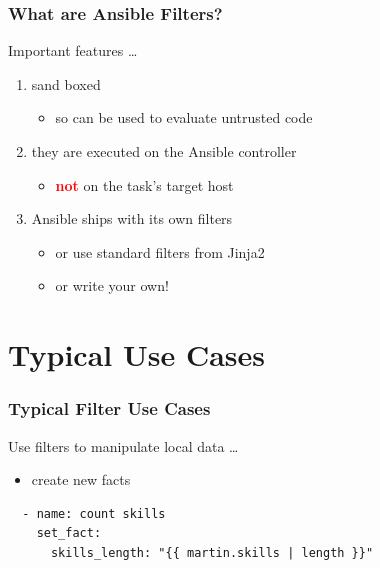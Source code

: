 \documentclass[pdf]{beamer}
\begin{document}
\begin{frame}
  \frametitle{What are Ansible Filters?}
  Important features \ldots
  \pause{}
  \begin{enumerate}
    \item{sand boxed}
      \pause{}
      \begin{itemize}
        \item{so can be used to evaluate untrusted code}
      \end{itemize}
      \pause{}
    \item{they are executed on the Ansible controller}
      \pause{}
      \begin{itemize}
        \item{\textcolor{red}{\textbf{not}} on the task's target host}
      \end{itemize}
      \pause{}
    \item{Ansible ships with its own filters}
      \pause{}
      \begin{itemize}
        \item{or use standard filters from Jinja2}
          \pause{}
        \item{or write your own!}
      \end{itemize}
  \end{enumerate}
\end{frame}

\section{Typical Use Cases}

\begin{frame}[fragile]
  \frametitle{Typical Filter Use Cases}
  Use filters to manipulate local data \ldots
  \begin{itemize}[<+->]
    \item \alert<1>{create new facts}
  \end{itemize}
  \begin{lstlisting}
  - name: count skills
    set_fact:
      skills_length: "{{ martin.skills | length }}"
  \end{lstlisting}
\end{frame}
\end{document}
